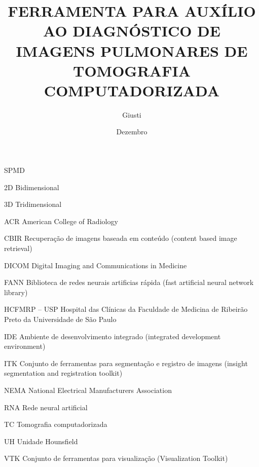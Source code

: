 \documentclass[tc]{texufpel}
\author{Giusti}{Filipe Vernetti}
\title{FERRAMENTA PARA AUXÍLIO AO DIAGNÓSTICO DE IMAGENS PULMONARES DE TOMOGRAFIA COMPUTADORIZADA}
\date{Dezembro}{2008}
\begin{document}
\maketitle

\makeexaminers




\listoffigures
\listoftables

\begin{listofabbrv}{SPMD}
	\item[2D] Bidimensional
	\item[3D] Tridimensional
	\item[ACR] American College of Radiology
	\item[CBIR] Recuperação de imagens baseada em conteúdo (content based image retrieval)
	\item[DICOM] Digital Imaging and Communications in Medicine
	\item[FANN] Biblioteca de redes neurais artificias rápida (fast artificial neural network library)
	\item[HCFMRP – USP] Hospital das Clínicas da Faculdade de Medicina de Ribeirão Preto da Universidade de São Paulo
	\item[IDE] Ambiente de desenvolvimento integrado (integrated development environment)
	\item[ITK] Conjunto de  ferramentas para segmentação e registro de imagens (insight segmentation and registration toolkit)
	\item[NEMA] National Electrical Manufacturers Association
	\item[RNA] Rede neural artificial
	\item[TC] Tomografia computadorizada
	\item[UH] Unidade Hounsfield
	\item[VTK] Conjunto de ferramentas para visualização (Visualization Toolkit)
\end{listofabbrv}

\tableofcontents










\end{document}
